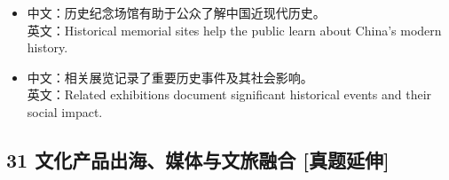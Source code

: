 \documentclass[a4paper,11pt,UTF8,fontset=none]{ctexart}
\begin{document}
\par

\begin{itemize}[leftmargin=1.7em,itemsep=1pt,parsep=0pt,topsep=2pt]
\item \noindent 中文：历史纪念场馆有助于公众了解中国近现代历史。\\ 英文：Historical memorial sites help the public learn about China’s modern history.\par


\item \noindent 中文：相关展览记录了重要历史事件及其社会影响。\\ 英文：Related exhibitions document significant historical events and their social impact.\par


\end{itemize}

\subsection{31 文化产品出海、媒体与文旅融合 {\color{AccentBlue} [真题延伸]}}
\end{document}
